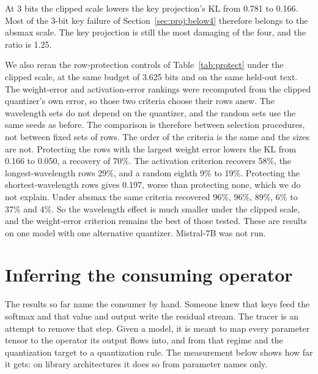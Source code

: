 \documentclass[10pt]{article}
\newcommand{\KL}{\mathrm{KL}}
\begin{document}
At 3 bits the clipped scale lowers the key projection's $\KL$ from 0.781 to 0.166. Most of the
3-bit key failure of Section~\ref{sec:proj:below4} therefore belongs to the absmax scale. The
key projection is still the most damaging of the four, and the ratio is 1.25.

We also reran the row-protection controls of Table~\ref{tab:protect} under the clipped scale, at
the same budget of 3.625 bits and on the same held-out text. The weight-error and
activation-error rankings were recomputed from the clipped quantizer's own error, so those two
criteria choose their rows anew. The wavelength sets do not depend on the quantizer, and the
random sets use the same seeds as before. The comparison is therefore between selection
procedures, not between fixed sets of rows. The order of the criteria is the
same and the sizes are not. Protecting the rows with the largest weight error lowers the $\KL$
from 0.166 to 0.050, a recovery of 70\%. The activation criterion recovers 58\%, the
longest-wavelength rows 29\%, and a random eighth 9\% to 19\%. Protecting the shortest-wavelength
rows gives 0.197, worse than protecting none, which we do not explain. Under absmax the same
criteria recovered 96\%, 96\%, 89\%, 6\% to 37\% and 4\%. So the wavelength effect is much
smaller under the clipped scale, and the weight-error criterion remains the best of those
tested. These are results on one model with one alternative quantizer. Mistral-7B was not run.

\section{Inferring the consuming operator}\label{sec:trace}

The results so far name the consumer by hand. Someone knew that keys feed the softmax and that
value and output write the residual stream. The tracer is an attempt to remove that step. Given a model, it is meant to map
every parameter tensor to the operator its output flows into, and from that regime and the
quantization target to a quantization rule. The measurement below shows how far it gets: on
library architectures it does so from parameter names only.
\end{document}
